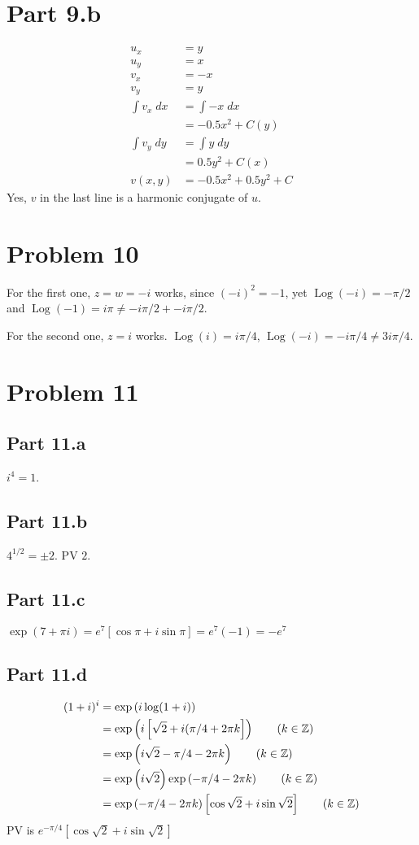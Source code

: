 \documentclass{article}
\theoremstyle{definition}
\newcommand{\Z}{\mathbb{Z}}
\newcommand{\p}[1]{\left(#1\right)}
\newcommand{\sq}[1]{\left[#1\right]}
\begin{document}
\section{Part 9.b}
\begin{align*}
u_x &= y \\
u_y &= x \\
v_x &= -x \tag{C-R} \\
v_y &= y \tag{C-R} \\
\int v_x \;dx 
&= \int -x \;dx \\
&= -0.5 x^2 +C(y) \\
\int v_y \;dy
&= \int y \;dy \\
&= 0.5 y^2 + C(x) \\
v(x,y) &= -0.5x^2 + 0.5 y^2 + C
\end{align*}
Yes, $v$ in the last line is a harmonic conjugate of $u$.

\section{Problem 10}
For the first one, $z=w=-i$ works, since $(-i)^2=-1$, yet
$\operatorname{Log}(-i) = -\pi/2$ and $\operatorname{Log}(-1) 
= i\pi \neq -i\pi/2 + -i\pi/2$.

For the second one, $z=i$ works. $\operatorname{Log}(i) 
= i\pi/4$, $\operatorname{Log}(-i) = -i\pi/4 \neq 3i\pi/4$.

\section{Problem 11}
\subsection{Part 11.a}
$i^4=1$.
\subsection{Part 11.b}
$4^{1/2} = \pm 2$. PV $2$.
\subsection{Part 11.c}
$\exp(7+\pi i) = e^7 \sq{\cos \pi + i \sin \pi} = e^7(-1) = -e^7$
\subsection{Part 11.d}
\begin{align*}
(1+i)^i 
&= \exp\p{ i \log (1+i) } \\
&= \exp\p{ i \sq{\sqrt{2} + i(\pi/4 + 2\pi k}} \tag{$k \in \Z$}\\
&= \exp\p{ i \sqrt{2} - \pi/4 - 2\pi k } \tag{$k \in \Z$}\\
&= \exp\p{ i \sqrt{2}} \exp\p{-\pi/4 - 2 \pi k} \tag{$k \in \Z$}\\
&= \exp\p{-\pi/4 - 2 \pi k} \sq{\cos\sqrt{2} + i\sin \sqrt{2}} \tag{$k \in \Z$}\\
\end{align*}
PV is $e^{-\pi/4} \sq{\cos \sqrt{2} + i\sin\sqrt{2}}$
\end{document}

